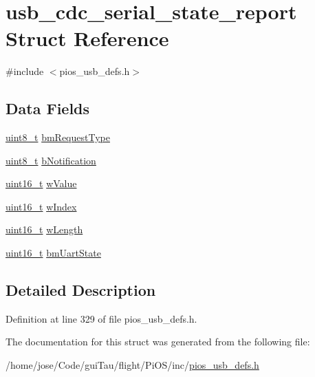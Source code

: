 \hypertarget{structusb__cdc__serial__state__report}{\section{usb\-\_\-cdc\-\_\-serial\-\_\-state\-\_\-report Struct Reference}
\label{structusb__cdc__serial__state__report}
}


{\ttfamily \#include $<$pios\-\_\-usb\-\_\-defs.\-h$>$}

\subsection*{Data Fields}
\begin{DoxyCompactItemize}
\item 
\hyperlink{stdint_8h_aba7bc1797add20fe3efdf37ced1182c5}{uint8\-\_\-t} \hyperlink{group___p_i_o_s___u_s_b___d_e_f_s_gaaadf08281b8967b649e2ce6cef9f9279}{bm\-Request\-Type}
\item 
\hyperlink{stdint_8h_aba7bc1797add20fe3efdf37ced1182c5}{uint8\-\_\-t} \hyperlink{group___p_i_o_s___u_s_b___d_e_f_s_ga6d3890d58ae8ae0300f94f680f8ca090}{b\-Notification}
\item 
\hyperlink{stdint_8h_a273cf69d639a59973b6019625df33e30}{uint16\-\_\-t} \hyperlink{group___p_i_o_s___u_s_b___d_e_f_s_ga6049498eadec3759d00a4063f911a58e}{w\-Value}
\item 
\hyperlink{stdint_8h_a273cf69d639a59973b6019625df33e30}{uint16\-\_\-t} \hyperlink{group___p_i_o_s___u_s_b___d_e_f_s_ga4246e449725cf89b5d38be3b9396a3ca}{w\-Index}
\item 
\hyperlink{stdint_8h_a273cf69d639a59973b6019625df33e30}{uint16\-\_\-t} \hyperlink{group___p_i_o_s___u_s_b___d_e_f_s_gaae61f52ac5f36605dd23f8a082ae609a}{w\-Length}
\item 
\hyperlink{stdint_8h_a273cf69d639a59973b6019625df33e30}{uint16\-\_\-t} \hyperlink{group___p_i_o_s___u_s_b___d_e_f_s_gad0e5711c1eafe5a6c8eeeed328cd58e5}{bm\-Uart\-State}
\end{DoxyCompactItemize}


\subsection{Detailed Description}


Definition at line 329 of file pios\-\_\-usb\-\_\-defs.\-h.



The documentation for this struct was generated from the following file\-:\begin{DoxyCompactItemize}
\item 
/home/jose/\-Code/gui\-Tau/flight/\-Pi\-O\-S/inc/\hyperlink{pios__usb__defs_8h}{pios\-\_\-usb\-\_\-defs.\-h}\end{DoxyCompactItemize}
